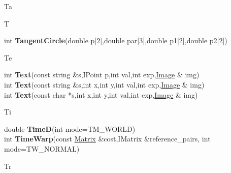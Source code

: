 \documentclass[10pt,titlepage]{article}
\def\functionlistentry#1#2#3#4#5#6{\noindent #1 {\bf #2}(#3) \dotfill #6\\}
\def\letterref#1{}
\def\letterlabel#1{\vspace{0.5cm}\centerline{\Large #1}}
\def\letterlabelend#1{}
\begin{document}
{{\letterlabel{Ta}
\letterlabel{T}
\letterref{A}
\letterref{B}
\letterref{C}
\letterref{D}
\letterref{E}
\letterref{F}
\letterref{G}
\letterref{H}
\letterref{I}
\letterref{K}
\letterref{L}
\letterref{M}
\letterref{N}
\letterref{O}
\letterref{P}
\letterref{Q}
\letterref{R}
\letterref{S}
\letterref{T}
\letterref{U}
\letterref{V}
\letterref{W}
\letterref{X}
\letterref{Y}
\letterref{Z}

\letterref{Ta}
\letterref{Te}
\letterref{Ti}
\letterref{Tr}
\letterlabelend{Ta}
\functionlistentry{int}{TangentCircle}{double p[2],double par[3],double p1[2],double p2[2]}{1378}{numeric}{}

\letterlabel{Te}
\letterref{A}
\letterref{B}
\letterref{C}
\letterref{D}
\letterref{E}
\letterref{F}
\letterref{G}
\letterref{H}
\letterref{I}
\letterref{K}
\letterref{L}
\letterref{M}
\letterref{N}
\letterref{O}
\letterref{P}
\letterref{Q}
\letterref{R}
\letterref{S}
\letterref{T}
\letterref{U}
\letterref{V}
\letterref{W}
\letterref{X}
\letterref{Y}
\letterref{Z}

\letterref{Ta}
\letterref{Te}
\letterref{Ti}
\letterref{Tr}
\letterlabelend{Te}
\functionlistentry{int}{Text}{const string \&s,IPoint p,int val,int exp,\hyperlink{Image}{Image} \& img}{1314}{graphics}{}
\functionlistentry{int}{Text}{const string \&s,int x,int y,int val,int exp,\hyperlink{Image}{Image} \& img}{1315}{graphics}{}
\functionlistentry{int}{Text}{const char *s,int x,int y,int val,int exp,\hyperlink{Image}{Image} \& img}{1316}{graphics}{}

\letterlabel{Ti}
\letterref{A}
\letterref{B}
\letterref{C}
\letterref{D}
\letterref{E}
\letterref{F}
\letterref{G}
\letterref{H}
\letterref{I}
\letterref{K}
\letterref{L}
\letterref{M}
\letterref{N}
\letterref{O}
\letterref{P}
\letterref{Q}
\letterref{R}
\letterref{S}
\letterref{T}
\letterref{U}
\letterref{V}
\letterref{W}
\letterref{X}
\letterref{Y}
\letterref{Z}

\letterref{Ta}
\letterref{Te}
\letterref{Ti}
\letterref{Tr}
\letterlabelend{Ti}
\functionlistentry{double}{TimeD}{int mode=TM\_WORLD}{1444}{genericTools}{}
\functionlistentry{int}{TimeWarp}{const \hyperlink{Matrix}{Matrix} \&cost,IMatrix \&reference\_pairs, int mode=TW\_NORMAL}{1265}{registration}{}

\letterlabel{Tr}
\letterref{A}
\letterref{B}
\letterref{C}
\letterref{D}
\letterref{E}
\letterref{F}
\letterref{G}
\letterref{H}
\letterref{I}
\letterref{K}
\letterref{L}
\letterref{M}
\letterref{N}
\letterref{O}
\letterref{P}
\letterref{Q}
\letterref{R}
\letterref{S}
\letterref{T}
\letterref{U}
\letterref{V}
\letterref{W}
\letterref{X}
\letterref{Y}
\letterref{Z}

}}
\end{document}
